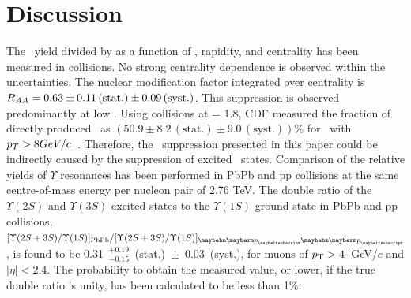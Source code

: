 \section{Discussion}
\label{sec:discussion}
The \PgUa\ yield divided by \taa as a function of \pt, rapidity, and
centrality has been measured in \PbPb collisions.  No strong
centrality dependence is observed within the uncertainties. The
nuclear modification factor integrated over centrality is $R_{AA} =
0.63\pm0.11\,(\text{stat.})\pm0.09\,(\text{syst.})$. This suppression
is observed predominantly at low \pt. Using \ppbar collisions at
\sqrts = 1.8\TeV, CDF measured the fraction of directly produced \PgUa\
as $(50.9\pm8.2\,(\text{stat.})\pm9.0\,(\text{syst.}))\%$ for \PgUa\
with $p_T>8GeV/c$~\cite{Affolder:1999wm}. Therefore, the \PgUa\
suppression presented in this paper could be indirectly caused by the
suppression of excited \PgU\ states.
Comparison of the relative yields of $\Upsilon$ resonances has been performed in PbPb and pp collisions at the same 
centre-of-mass energy per nucleon pair of 2.76 TeV. The double ratio of the $\Upsilon(2S)$ and $\Upsilon(3S)$ excited states to the $\Upsilon(1S)$ 
ground state in PbPb and pp collisions, $[\Upsilon(2S+3S)/\Upsilon(1S)]_{\rm PbPb}/[\Upsilon(2S+3S)/\Upsilon(1S)]_{\Pp\Pp}$, is found to be 
0.31~$_{-0.15}^{+0.19}$~(stat.)~$\pm$~0.03~(syst.), for muons of $p_{\rm T}>4$~GeV/$c$ and $|\eta|<2.4$. 
The probability to obtain the measured value, or lower, if the true double ratio is unity, has been calculated to be less than 1\%. 

